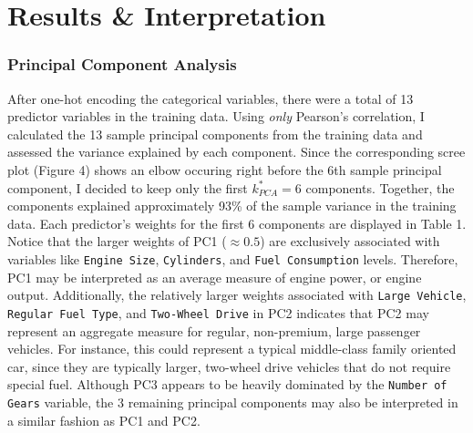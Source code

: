 \documentclass[11pt]{article}
\begin{document}
\section*{Results \& Interpretation}

\subsubsection*{Principal Component Analysis}

After one-hot encoding the categorical variables, there were a total of 13 predictor variables in the training data. Using \textit{only} Pearson's correlation, I calculated the 13 sample principal components from the training data and assessed the variance explained by each component. Since the corresponding scree plot (Figure 4) shows an elbow occuring right before the 6th sample principal component, I decided to keep only the first $k_{PCA}^* = 6$ components. Together, the components explained approximately 93\% of the sample variance in the training data. Each predictor's weights for the first 6 components are displayed in Table 1. Notice that the larger weights of PC1 ($\approx 0.5$) are exclusively associated with variables like \texttt{Engine Size}, \texttt{Cylinders}, and \texttt{Fuel Consumption} levels. Therefore, PC1 may be interpreted as an average measure of engine power, or engine output. Additionally, the relatively larger weights associated with \texttt{Large Vehicle}, \texttt{Regular Fuel Type}, and \texttt{Two-Wheel Drive} in PC2 indicates that PC2 may represent an aggregate measure for regular, non-premium, large passenger vehicles. For instance, this could represent a typical middle-class family oriented car, since they are typically larger, two-wheel drive vehicles that do not require special fuel. Although PC3 appears to be heavily dominated by the \texttt{Number of Gears} variable, the 3 remaining principal components may also be interpreted in a similar fashion as PC1 and PC2.

\
\end{document}
